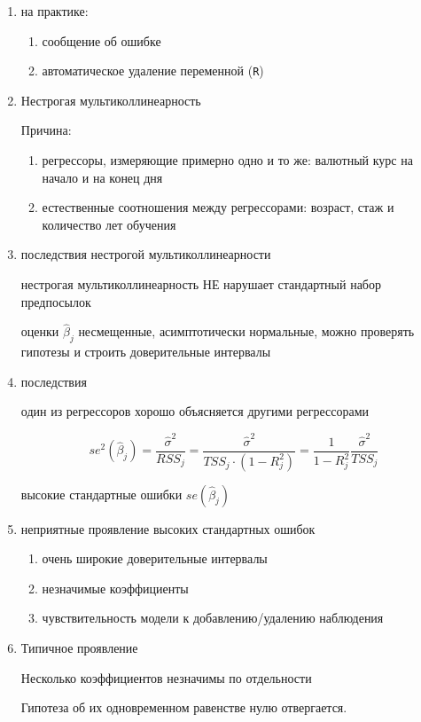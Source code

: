 \documentclass[12pt,a4paper]{article}
\begin{document}
{\begin{enumerate}
\item на практике: 
\begin{enumerate}
\item сообщение об ошибке
\item автоматическое удаление переменной (\verb|R|)
\end{enumerate}

\item Нестрогая мультиколлинеарность

Причина: 

\begin{enumerate}
\item регрессоры, измеряющие примерно одно и то же: валютный курс на начало и на конец дня
\item естественные соотношения между регрессорами: возраст, стаж и количество лет обучения
\end{enumerate}

\item последствия нестрогой мультиколлинеарности

нестрогая мультиколлинеарность НЕ нарушает стандартный набор предпосылок

оценки $\hat{\beta}_j$ несмещенные, асимптотически нормальные, можно проверять гипотезы и строить доверительные интервалы

\item последствия 

один из регрессоров хорошо объясняется другими регрессорами

\[
se^2(\hat{\beta}_j)=\frac{\hat{\sigma}^2}{RSS_j}=\frac{\hat{\sigma}^2}{TSS_j\cdot (1-R^2_j)}=
\frac{1}{1-R^2_j}\frac{\hat{\sigma}^2}{TSS_j}
\]

высокие стандартные ошибки $se(\hat{\beta}_j)$

\item неприятные проявление высоких стандартных ошибок

\begin{enumerate}
\item очень широкие доверительные интервалы
\item незначимые коэффициенты
\item чувствительность модели к добавлению/удалению наблюдения
\end{enumerate}

\item Типичное проявление

Несколько коэффициентов незначимы по отдельности

Гипотеза об их одновременном равенстве нулю отвергается.


\end{enumerate}}
\end{document}
